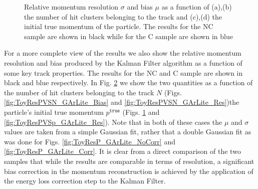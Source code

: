 \begin{figure}[t]
\begin{subfigure}[b]{0.42\textwidth}
         \caption{}
         \label{fig:ToyResPVSp_GArLite_Bias}
     \end{subfigure}
        \caption{Relative momentum resolution $\sigma$ and bias $\mu$ as a function of (a),(b) the number of hit clusters belonging to the track and (c),(d) the initial true momentum of the particle. The results for the NC sample are shown in black while for the C sample are shown in blue } \label{fig:ToyResPVS_GArLite}
\end{figure}



For a more complete view of the results we also show the relative momentum resolution and bias produced by the Kalman Filter algorithm as a function of some key track properties. The results for the NC and C sample are shown in black and blue respectively.  In Fig. \ref{fig:ToyResPVS_GArLite} we show the two quantities as a function of the number of hit clusters belonging to the track $N$ (Figs. \ref{fig:ToyResPVSN_GArLite_Bias} and \ref{fig:ToyResPVSN_GArLite_Res})the particle's initial true momentum $p^\texttt{true}$ (Figs. \ref{fig:ToyResPVSp_GArLite_Bias} and \ref{fig:ToyResPVSp_GArLite_Res}). Note that in both of these cases the $\mu$ and $\sigma$ values are taken from a simple Gaussian fit, rather that a double Gaussian fit as was done for Figs. \ref{fig:ToyResP_GArLite_NoCorr} and \ref{fig:ToyResP_GArLite_Corr}. It is clear from a direct comparison of the two samples that while the results are comparable in terms of resolution, a significant bias correction in the momentum reconstruction is achieved by the application of the energy loss correction step to the Kalman Filter. 


